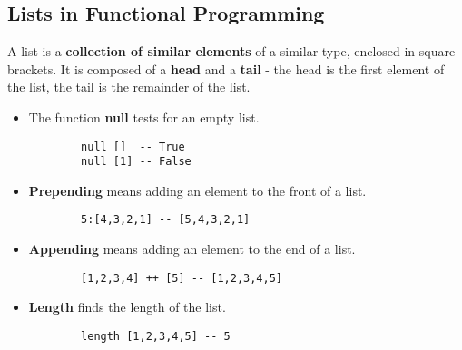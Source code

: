 \subsection{Lists in Functional Programming}

A list is a \textbf{collection of similar elements} of a similar type, enclosed in square brackets. It is composed of a \textbf{head} and a \textbf{tail} - the head is the first element of the list, the tail is the remainder of the list.
\begin{itemize}
    \item The function \textbf{null} tests for an empty list.
        \begin{verbatim}
        null []  -- True
        null [1] -- False
        \end{verbatim}
    \item \textbf{Prepending} means adding an element to the front of a list.
        \begin{verbatim}
        5:[4,3,2,1] -- [5,4,3,2,1]
        \end{verbatim}
    \item \textbf{Appending} means adding an element to the end of a list.
        \begin{verbatim}
        [1,2,3,4] ++ [5] -- [1,2,3,4,5]
        \end{verbatim}
    \item \textbf{Length} finds the length of the list.
        \begin{verbatim}
        length [1,2,3,4,5] -- 5
        \end{verbatim}
\end{itemize}
